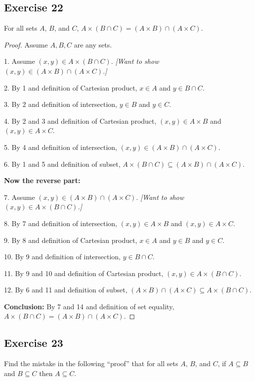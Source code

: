 \documentclass[14pt]{extarticle}
\begin{document}
\subsection{Exercise 22}
For all sets $A$, $B$, and $C$, \(A \times (B \cap C) = (A \times B) \cap (A \times C)\).

\begin{proof}
Assume $A,B,C$ are any sets.

1. Assume \((x, y) \in A \times (B \cap C)\). {\it [Want to show \((x, y) \in (A \times B) \cap (A \times C)\).]}

2. By 1 and definition of Cartesian product, $x \in A$ and \(y \in B \cap C\).

3. By 2 and definition of intersection, $y \in B$ and $y \in C$.

4. By 2 and 3 and definition of Cartesian product, \((x, y) \in A \times B\) and \((x, y) \in A \times C\).

5. By 4 and definition of intersection, \((x, y) \in (A \times B) \cap (A \times C)\).

6. By 1 and 5 and definition of subset, \(A \times (B \cap C) \subseteq (A \times B) \cap (A \times C)\).

{\bf Now the reverse part:}

7. Assume \((x, y) \in (A \times B) \cap (A \times C)\). {\it [Want to show \((x, y) \in A \times (B \cap C)\).]}

8. By 7 and definition of intersection, \((x,y) \in A \times B\) and \((x,y) \in A \times C\).

9. By 8 and definition of Cartesian product, $x \in A$ and $y \in B$ and $y \in C$.

10. By 9 and definition of intersection, \(y \in B \cap C\).

11. By 9 and 10 and definition of Cartesian product, \((x,y) \in A \times (B \cap C)\).

12. By 6 and 11 and definition of subset, \((A \times B) \cap (A \times C) \subseteq A \times (B \cap C)\).

{\bf Conclusion:} By 7 and 14 and definition of set equality, \(A \times (B \cap C) = (A \times B) \cap (A \times C)\).
\end{proof}

\subsection{Exercise 23}
Find the mistake in the following “proof” that for all sets $A$, $B$, and $C$, if \(A \subseteq B\) and 
\(B \subseteq C\) then \(A \subseteq C\).
\end{document}
